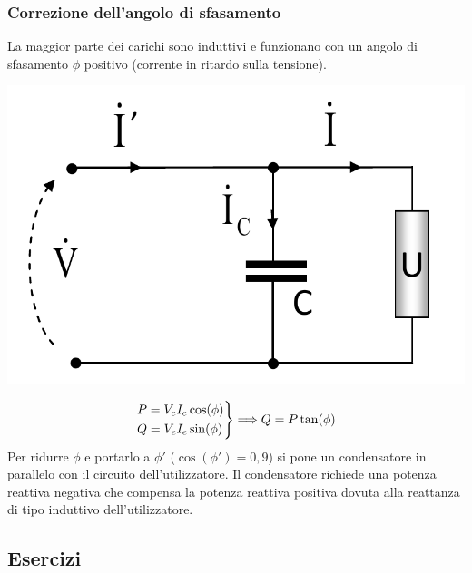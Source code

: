 \documentclass{article}
\begin{document}
\subsubsection*{Correzione dell'angolo di sfasamento}
La maggior parte dei carichi sono induttivi e funzionano con un angolo di sfasamento $\phi$ positivo (corrente in ritardo sulla tensione).
\begin{center}
    \includegraphics[scale=0.26]{Image/Fattore_di_potenza_1.png}
\end{center}
\[
    \begin{rcases}
        P = V_eI_e \cos(\phi)\\
        Q = V_eI_e \sin(\phi)
    \end{rcases}
    \Longrightarrow Q = P \tan(\phi)
\]
Per ridurre $\phi$ e portarlo a $\phi '$ ($\cos(\phi ')=0,9$) si pone un condensatore in parallelo con il circuito dell'utilizzatore. Il condensatore richiede una potenza reattiva negativa che compensa la potenza reattiva positiva dovuta alla reattanza di tipo induttivo dell'utilizzatore.







\subsection{Esercizi}
\end{document}
